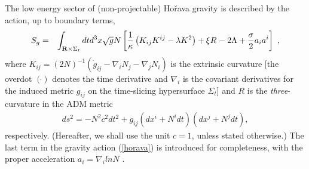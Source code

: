 \documentclass[preprint,aps,tightenlines,showkeys,nofootinbib,superscriptaddress]{revtex4}
\newcommand{\eq}{eqnarray}
\newcommand{\La}{{\Lambda}}
\newcommand{\Si}{{\Sigma}}
\newcommand{\f}{\frac}
\begin{document}
The low energy sector of (non-projectable) Ho\v{r}ava gravity \cite{DeWi:1967,Hora:2009} is described by the action, up to boundary terms,
\begin{\eq}
S_g &= & \int_{{\bf R} \times \Si_t} dt d^3 x
\sqrt{g}N\left[\frac{1}{\kappa}\left(K_{ij}K^{ij}-\lambda
K^2\right)+\xi R^{}-2 \La+\f{\sigma}{2} a_i a^i \right]\ ,
\label{horava}
\end{\eq}
where
$
 K_{ij}=({2N})^{-1}\left(\dot{g}_{ij}-\nabla_i
N_j-\nabla_jN_i\right)
$
is the extrinsic curvature [the overdot $(\dot{})$ denotes the time derivative and $\nabla_i$ is the covariant derivatives for the induced metric $g_{ij}$ on the time-slicing hypersurface $\Si_t$] and $R$ is the {\it three}-curvature in the ADM metric
\begin{\eq}
\label{metric}
ds^2=-N^2 c^2 dt^2+g_{ij}\left(dx^i+N^i dt\right)\left(dx^j+N^j
dt\right),
\end{\eq}
respectively. (Hereafter, we shall use the unit $c=1$, unless stated otherwise.)
The last term in the gravity action (\ref{horava}) is introduced for completeness, with the proper acceleration $a_i=\nabla_i ln N$ \cite{Blas:2009}.
\end{document}
